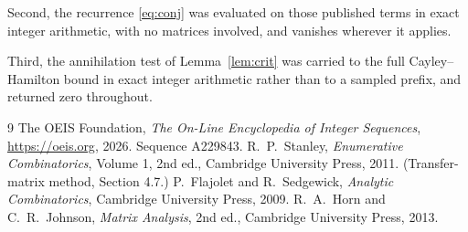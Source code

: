 \documentclass[11pt,a4paper]{article}
\theoremstyle{plain}
\theoremstyle{definition}
\begin{document}
Second, the recurrence \eqref{eq:conj} was evaluated on those published terms in exact
integer arithmetic, with no matrices involved, and vanishes wherever it applies.

Third, the annihilation test of Lemma~\ref{lem:crit} was carried to the full
Cayley--Hamilton bound in exact integer arithmetic rather than to a sampled prefix, and
returned zero throughout.

\begin{thebibliography}{9}
 The OEIS Foundation, \emph{The On-Line Encyclopedia of Integer
Sequences}, \url{https://oeis.org}, 2026. Sequence A229843.
 R.~P.~Stanley, \emph{Enumerative Combinatorics}, Volume 1, 2nd ed.,
Cambridge University Press, 2011. (Transfer-matrix method, Section 4.7.)
 P.~Flajolet and R.~Sedgewick, \emph{Analytic Combinatorics}, Cambridge
University Press, 2009.
 R.~A.~Horn and C.~R.~Johnson, \emph{Matrix Analysis}, 2nd ed., Cambridge
University Press, 2013.
\end{thebibliography}
\end{document}
